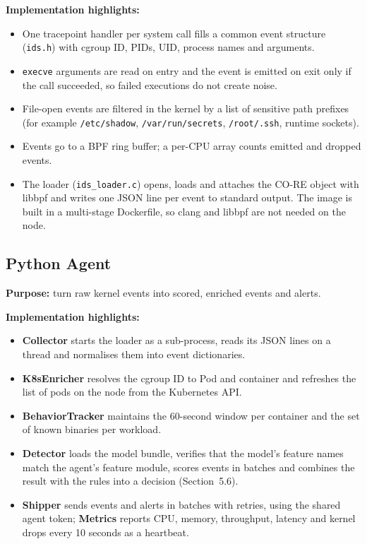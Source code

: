 \textbf{Implementation highlights:}
\begin{itemize}
    \item One tracepoint handler per system call fills a common event structure
          (\texttt{ids.h}) with cgroup ID, PIDs, UID, process names and arguments.
    \item \texttt{execve} arguments are read on entry and the event is emitted on exit
          only if the call succeeded, so failed executions do not create noise.
    \item File-open events are filtered in the kernel by a list of sensitive path
          prefixes (for example \texttt{/etc/shadow}, \texttt{/var/run/secrets},
          \texttt{/root/.ssh}, runtime sockets).
    \item Events go to a BPF ring buffer; a per-CPU array counts emitted and dropped
          events.
    \item The loader (\texttt{ids\_loader.c}) opens, loads and attaches the CO-RE object
          with libbpf and writes one JSON line per event to standard output. The image is
          built in a multi-stage Dockerfile, so clang and libbpf are not needed on the
          node.
\end{itemize}

\subsection{Python Agent}

\textbf{Purpose:} turn raw kernel events into scored, enriched events and alerts.

\textbf{Implementation highlights:}
\begin{itemize}
    \item \textbf{Collector} starts the loader as a sub-process, reads its JSON lines on a
          thread and normalises them into event dictionaries.
    \item \textbf{K8sEnricher} resolves the cgroup ID to Pod and container and refreshes
          the list of pods on the node from the Kubernetes API.
    \item \textbf{BehaviorTracker} maintains the 60-second window per container and the
          set of known binaries per workload.
    \item \textbf{Detector} loads the model bundle, verifies that the model's feature
          names match the agent's feature module, scores events in batches and combines
          the result with the rules into a decision (Section~5.6).
    \item \textbf{Shipper} sends events and alerts in batches with retries, using the
          shared agent token; \textbf{Metrics} reports CPU, memory, throughput, latency
          and kernel drops every 10 seconds as a heartbeat.
\end{itemize}

